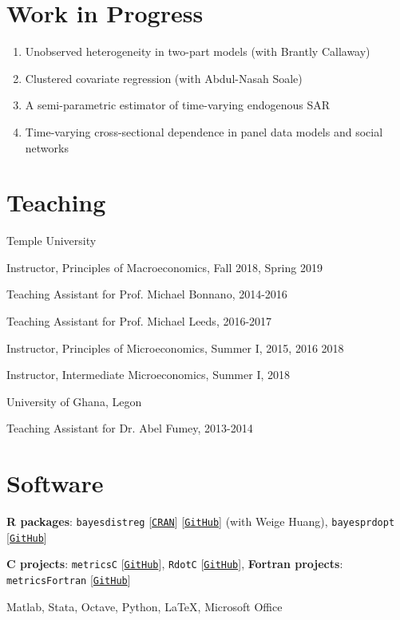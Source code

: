\documentclass[letterpaper]{article}
\renewenvironment{itemize}{
  \begin{list}{}{
    \setlength{\leftmargin}{1.5em}
  }
}{
  \end{list}
}
\begin{document}
\section*{Work in Progress}
\begin{enumerate}
	\item Unobserved heterogeneity in two-part models (with Brantly Callaway)
	\item Clustered covariate regression (with Abdul-Nasah Soale)
	\item A semi-parametric estimator of time-varying endogenous SAR
	\item Time-varying cross-sectional dependence in panel data models and social networks
\end{enumerate}

\section*{Teaching}
\begin{enumerate}
	\item Temple University
	\begin{itemize}
		\item Instructor, Principles of Macroeconomics, Fall 2018, Spring 2019
		\item Teaching Assistant for Prof. Michael Bonnano, 2014-2016
		\item Teaching Assistant for Prof. Michael Leeds, 2016-2017
		\item Instructor, Principles of Microeconomics, Summer I, 2015, 2016 2018
		\item Instructor, Intermediate Microeconomics, Summer I, 2018
	\end{itemize}
	\item University of Ghana, Legon
	\begin{itemize}
		\item Teaching Assistant for Dr. Abel Fumey, 2013-2014
	\end{itemize}
\end{enumerate}


\section*{Software}
\begin{itemize}
  \item \textbf{R packages}: \texttt{bayesdistreg} [\texttt{\href{https://CRAN.R-project.org/package=bayesdistreg}{CRAN}}] [\texttt{\href{https://estsyawo.github.io/bayesdistreg/}{GitHub}}] (with Weige Huang), \texttt{bayesprdopt} [\texttt{\href{https://github.com/estsyawo/bayesprdopt}{GitHub}}]

  \item \textbf{C projects}: \texttt{metricsC} [\texttt{\href{https://github.com/estsyawo/metricsC}{GitHub}}], \texttt{RdotC} [\texttt{\href{https://github.com/estsyawo/RdotC}{GitHub}}], \textbf{Fortran projects}: \texttt{metricsFortran} [\texttt{\href{https://github.com/estsyawo/metricsFortran}{GitHub}}]
  \item Matlab,  Stata, Octave, Python, \LaTeX, Microsoft Office
\end{itemize}
\end{document}
